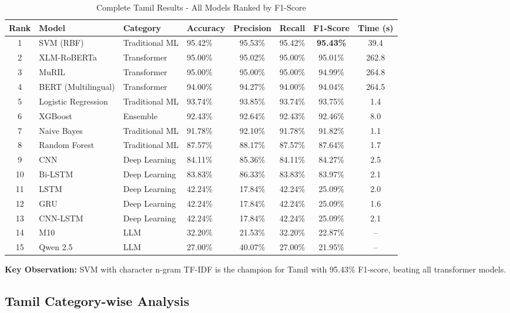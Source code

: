 \documentclass[conference]{IEEEtran}
\begin{document}
\begin{table}[!t]
\centering
\caption{Complete Tamil Results - All Models Ranked by F1-Score}
\label{tab:tamil_results}
\begin{tabular}{clllcccc}
\toprule
\textbf{Rank} & \textbf{Model} & \textbf{Category} & \textbf{Accuracy} & \textbf{Precision} & \textbf{Recall} & \textbf{F1-Score} & \textbf{Time (s)} \\
\midrule
1 & SVM (RBF) & Traditional ML & 95.42\% & 95.53\% & 95.42\% & \textbf{95.43\%} & 39.4 \\
2 & XLM-RoBERTa & Transformer & 95.00\% & 95.02\% & 95.00\% & 95.01\% & 262.8 \\
3 & MuRIL & Transformer & 95.00\% & 95.00\% & 95.00\% & 94.99\% & 264.8 \\
4 & BERT (Multilingual) & Transformer & 94.00\% & 94.27\% & 94.00\% & 94.04\% & 264.5 \\
5 & Logistic Regression & Traditional ML & 93.74\% & 93.85\% & 93.74\% & 93.75\% & 1.4 \\
6 & XGBoost & Ensemble & 92.43\% & 92.64\% & 92.43\% & 92.46\% & 8.0 \\
7 & Naive Bayes & Traditional ML & 91.78\% & 92.10\% & 91.78\% & 91.82\% & 1.1 \\
8 & Random Forest & Traditional ML & 87.57\% & 88.17\% & 87.57\% & 87.64\% & 1.7 \\
9 & CNN & Deep Learning & 84.11\% & 85.36\% & 84.11\% & 84.27\% & 2.5 \\
10 & Bi-LSTM & Deep Learning & 83.83\% & 86.33\% & 83.83\% & 83.97\% & 2.1 \\
11 & LSTM & Deep Learning & 42.24\% & 17.84\% & 42.24\% & 25.09\% & 2.0 \\
12 & GRU & Deep Learning & 42.24\% & 17.84\% & 42.24\% & 25.09\% & 1.6 \\
13 & CNN-LSTM & Deep Learning & 42.24\% & 17.84\% & 42.24\% & 25.09\% & 2.1 \\
14 & M10 & LLM & 32.20\% & 21.53\% & 32.20\% & 22.87\% & -- \\
15 & Qwen 2.5 & LLM & 27.00\% & 40.07\% & 27.00\% & 21.95\% & -- \\
\bottomrule
\end{tabular}
\end{table}

\textbf{Key Observation:} SVM with character n-gram TF-IDF is the champion for Tamil with 95.43\% F1-score, beating all transformer models.

\subsection{Tamil Category-wise Analysis}
\end{document}

